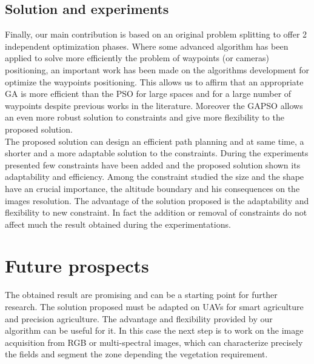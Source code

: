 \subsection{Solution and experiments }
Finally,  our main contribution is based on an original problem splitting to offer 2 independent optimization phases. Where some advanced algorithm has been applied to solve more efficiently the problem of waypoints (or cameras) positioning, an important work has been made on the algorithms development for  optimize the waypoints positioning. This allows us to affirm that an appropriate GA is more efficient than the PSO for large spaces and for a large number of waypoints despite previous works in the literature. Moreover the GAPSO allows an even more robust solution to constraints and give more flexibility to the proposed solution. \\
The proposed solution can design an efficient path planning and at same time, a shorter and a more adaptable solution to the constraints. During the experiments presented few constraints have been added and the proposed solution shown its adaptability and efficiency. Among the constraint studied  the size and the shape have an crucial importance, the  altitude boundary and his consequences on the images resolution.
The advantage of the solution proposed is the adaptability and flexibility to new constraint. In fact the addition or removal of constraints do not affect much the result obtained during the experimentations.

\section{Future prospects}
The obtained result are promising and can be a starting point for further research. 
The solution proposed must be adapted on UAVs for smart agriculture and precision agriculture. The advantage and flexibility provided by our algorithm can be useful for it. In this case the next step is to work on the image acquisition from RGB or multi-spectral images, which can characterize precisely the fields and segment the zone depending the vegetation requirement. %

